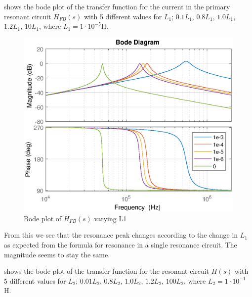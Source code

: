  shows the bode plot of the transfer function for the current in the primary resonant circuit $H_{FB}(s)$ with 5 different values for $L_1$; $0.1 L_1$, $0.8 L_1$, $1.0 L_1$, $1.2 L_1$, $10 L_1$, where $L_1 = 1 \cdot 10^{-5}$H.
\begin{figure}[H]
    \centering
    \includegraphics[width=\textwidth]{img/FeedBackBode_L1.eps}
    \caption{Bode plot of $H_{FB}(s)$ varying L1}
    \label{fig:fbbode_l1}
\end{figure}

From this we see that the resonance peak changes according to the change in $L_1$ as expected from the formula for resonance in a single resonance circuit. The magnitude seems to stay the same.

\newpage
{} shows the bode plot of the transfer function for the resonant circuit $H(s)$ with 5 different values for $L_2$; $0.01 L_2$, $0.8 L_2$, $1.0 L_2$, $1.2 L_2$, $100 L_2$, where $L_2 = 1 \cdot 10^{-1}$H.

